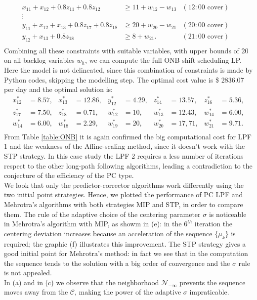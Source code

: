 \documentclass[a4paper,10 pt,titlepage,twoside]{book}
\theoremstyle{plain}
\theoremstyle{definition}
\theoremstyle{remark}
\begin{document}
{{\begin{align*}
x_{11}+x_{12}+0.8z_{11}+0.8z_{12}&\geq11 +w_{12}-w_{13}&(12:00 \text{ cover})&\\
\vdots&&&\\
y_{11}+x_{12}+x_{13}+0.8z_{17}+0.8z_{18}&\geq 20 +w_{20}-w_{21}&(20:00 \text{ cover})&\\
y_{12}+x_{13}+0.8z_{18}&\geq 8 +w_{21}.&(21:00 \text{ cover})&\\
\end{align*}
Combining all these constraints with suitable variables, with upper bounds of 20 on all backlog variables $w_{h}$, we can compute the full ONB shift scheduling LP. Here the model is not delineated, since this combination of constraints is made by Python codes, skipping the modelling step. The optimal cost value is \$ 2836.07 per day and the optimal solution is:
\begin{align*}
x_{12}^{*} &=  8.57, & x_{13}^{*}&=  12.86, & y_{12}^{*} &= 4.29, & z_{14}^{*} &= 13.57, &z_{16}^{*} &= 5.36,\\
z_{17}^{*} &= 7.50, & z_{18}^{*}&= 0.71,  & w_{12}^{*} &= 10, & w_{13}^{*} &= 12.43, &w_{14}^{*} &=  6.00,\\
w_{14}^{*} &=  6.00, & w_{18}^{*}&=  2.29, & w_{19}^{*} &= 20, & w_{20}^{*} &= 17,71, &w_{21}^{*} &= 9.71.\\
\end{align*}
From Table \ref{table:ONB} it is again confirmed the big computational cost for LPF 1 and the weakness of the Affine-scaling method, since it doesn't work with the STP strategy. In this case study the LPF 2 requires a less number of iterations respect to the other long-path following algorithms, leading a contradiction to the conjecture of the efficiency of the PC type.\\ 
We look that only the predictor-corrector algorithms work differently using the two initial point strategies.
Hence, we plotted the performance of PC LPF and Mehrotra's algorithms with both strategies MIP and STP, in order to compare them. The rule of the adaptive choice of the centering parameter $\sigma$ is noticeable in Mehrotra's algorithm with MIP, as showm in (e): in the $6^{th}$ iteration the centering deviation increases because an acceleration of the sequence $\{\mu_{k}\}$ is required; the graphic (f) illustrates this improvement. The STP strategy gives a good initial point for Mehrotra's method: in fact we see that in the computation the sequence tends to the solution with a big order of convergence and the $\sigma$ rule is not appealed.\\
In (a) and in (c) we observe that the neighborhood $\mathcal{N}_{-\infty}$ prevents the sequence moves away from the $\mathcal{C}$, making the power of the adaptive $\sigma$ impraticable.\\  

}}
\end{document}
